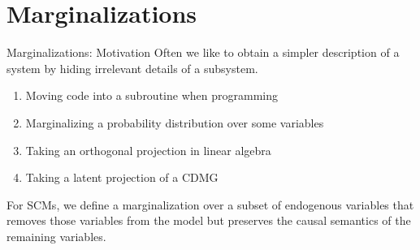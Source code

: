 \part{Marginalizations}
\frame{\partpage}

\begin{frame}{Marginalizations: Motivation}
  Often we like to obtain a simpler description of a system by hiding irrelevant details of a subsystem.

  \begin{Eg}
    \begin{enumerate}
      \item Moving code into a subroutine when programming
      \item Marginalizing a probability distribution over some variables
      \item Taking an orthogonal projection in linear algebra
      \item Taking a latent projection of a CDMG
    \end{enumerate}
  \end{Eg}

  For SCMs, we define a marginalization over a subset of endogenous variables that removes those
  variables from the model but preserves the causal semantics of the remaining variables.
\end{frame}

